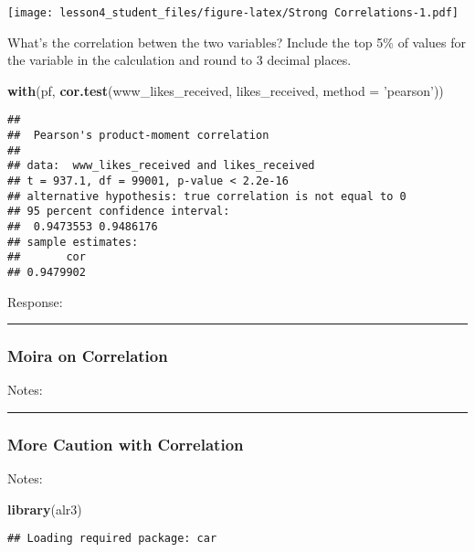 \documentclass[]{article}
\newenvironment{Shaded}{\begin{snugshade}}{\end{snugshade}}
\newcommand{\KeywordTok}[1]{\textcolor[rgb]{0.13,0.29,0.53}{\textbf{#1}}}
\newcommand{\DataTypeTok}[1]{\textcolor[rgb]{0.13,0.29,0.53}{#1}}
\newcommand{\StringTok}[1]{\textcolor[rgb]{0.31,0.60,0.02}{#1}}
\newcommand{\NormalTok}[1]{#1}
\begin{document}
\texttt{[image: lesson4\_student\_files/figure-latex/Strong Correlations-1.pdf]}

What's the correlation betwen the two variables? Include the top 5\% of
values for the variable in the calculation and round to 3 decimal
places.

\begin{Shaded}
\begin{Highlighting}[]
\KeywordTok{with}\NormalTok{(pf, }\KeywordTok{cor.test}\NormalTok{(www_likes_received, likes_received, }\DataTypeTok{method =} \StringTok{'pearson'}\NormalTok{))}
\end{Highlighting}
\end{Shaded}

\begin{verbatim}
## 
##  Pearson's product-moment correlation
## 
## data:  www_likes_received and likes_received
## t = 937.1, df = 99001, p-value < 2.2e-16
## alternative hypothesis: true correlation is not equal to 0
## 95 percent confidence interval:
##  0.9473553 0.9486176
## sample estimates:
##       cor 
## 0.9479902
\end{verbatim}

Response:

\begin{center}\rule{0.5\linewidth}{\linethickness}\end{center}

\subsubsection{Moira on Correlation}\label{moira-on-correlation}

Notes:

\begin{center}\rule{0.5\linewidth}{\linethickness}\end{center}

\subsubsection{More Caution with
Correlation}\label{more-caution-with-correlation}

Notes:

\begin{Shaded}
\begin{Highlighting}[]
\KeywordTok{library}\NormalTok{(alr3)}
\end{Highlighting}
\end{Shaded}

\begin{verbatim}
## Loading required package: car
\end{verbatim}
\end{document}
